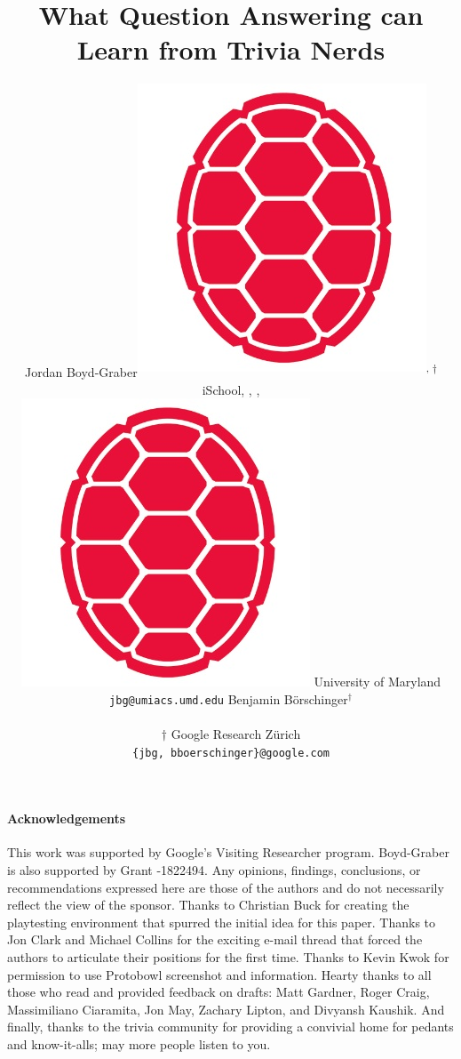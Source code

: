 \documentclass[table,11pt,a4]{article}
\title{What Question Answering can Learn from Trivia Nerds}
\author{ Jordan Boyd-Graber\textsuperscript{\includegraphics[scale=0.02]{2020_acl_trivia_tournament/figures/redshell}, $\dagger$} \\
iSchool, \abr{cs}, \abr{umiacs}, \abr{lsc} \\
\includegraphics[scale=0.03]{2020_acl_trivia_tournament/figures/redshell} University of Maryland \\ 
\texttt{jbg@umiacs.umd.edu} \And
 Benjamin B\"orschinger$^\dagger$ \\
\\
$\dagger$ Google Research Z\"urich\\
\hphantom{\dots\dots\dots\dots}\texttt{\{jbg, bboerschinger\}@google.com}\hphantom{\dots\dots}}
\newcommand{\latexfile}[1]{}
\begin{document}
\maketitle

\latexfile{00-abstract}
\latexfile{10-intro}
\latexfile{20-tournaments}
\latexfile{30-craft}
\latexfile{60-qb}
\latexfile{90-call}

\footnotesize
\paragraph{Acknowledgements}

This work was supported by Google's Visiting Researcher program.
Boyd-Graber is also supported by  Grant -1822494.
Any opinions, findings,
conclusions, or recommendations expressed here are those of the
authors and do not necessarily reflect the view of the sponsor.
Thanks to Christian Buck for creating the  playtesting environment that spurred the initial idea for this paper.
Thanks to Jon Clark and Michael Collins for the exciting e-mail thread that forced the authors to articulate their positions for the first time.
Thanks to Kevin Kwok for permission to use Protobowl screenshot and information.
Hearty thanks to all those who read and provided feedback on drafts: 
Matt Gardner,
Roger Craig,
Massimiliano Ciaramita, 
Jon May,
Zachary Lipton,
and Divyansh Kaushik.
And finally, thanks to the trivia community for providing a convivial home for pedants and know-it-alls; may more people listen to you.




\clearpage
\setcounter{section}{0}
\renewcommand{\thesection}{\Alph{section}} 
\latexfile{appendix}
\end{document}

